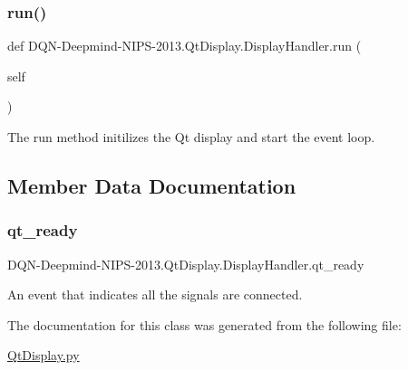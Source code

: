 \subsubsection{\texorpdfstring{run()}{run()}}
{\footnotesize\ttfamily def D\+QN-\/Deepmind-\/N\+I\+PS-\/2013.Qt\+Display.\+Display\+Handler.\+run (\begin{DoxyParamCaption}\item[{}]{self }\end{DoxyParamCaption})}



The run method initilizes the Qt display and start the event loop. 



\subsection{Member Data Documentation}
\hypertarget{classDQN-Deepmind-NIPS-2013_1_1QtDisplay_1_1DisplayHandler_a5c3b4122e47a768cd3ef67f478ee25c0}{}\label{classDQN-Deepmind-NIPS-2013_1_1QtDisplay_1_1DisplayHandler_a5c3b4122e47a768cd3ef67f478ee25c0} 
\subsubsection{\texorpdfstring{qt\+\_\+ready}{qt\_ready}}
{\footnotesize\ttfamily D\+QN-\/Deepmind-\/N\+I\+PS-\/2013.Qt\+Display.\+Display\+Handler.\+qt\+\_\+ready}



An event that indicates all the signals are connected. 



The documentation for this class was generated from the following file\+:\begin{DoxyCompactItemize}
\item 
\hyperlink{QtDisplay_8py}{Qt\+Display.\+py}\end{DoxyCompactItemize}
